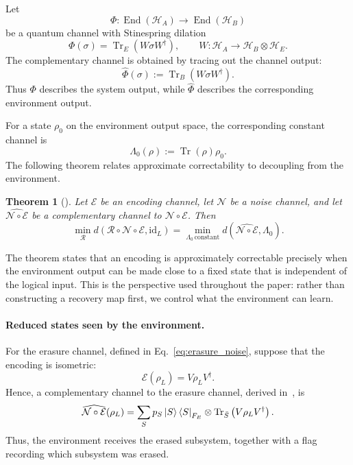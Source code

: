\documentclass[10pt,twocolumn,superscriptaddress,aps,amsmath,amssymb,citeautoscript,floatfix,prx,longbibliography]{revtex4-2}
\newtheorem{theorem}{Theorem}
\theoremstyle{plain}
\theoremstyle{plain}
\theoremstyle{plain}
\theoremstyle{plain}
\theoremstyle{plain}
\theoremstyle{plain}
\begin{document}
Let
$$
\Phi:\operatorname{End}(\mathcal H_A)\to\operatorname{End}(\mathcal H_B)
$$
be a quantum channel with Stinespring dilation
$$
\Phi(\sigma)
=
\operatorname{Tr}_E(W\sigma W^\dagger),
\qquad
W:\mathcal H_A\to\mathcal H_B\otimes\mathcal H_E .
$$
The complementary channel is obtained by tracing out the channel output:
$$
\widehat\Phi(\sigma)
:=
\operatorname{Tr}_B(W\sigma W^\dagger).
$$
Thus $\Phi$ describes the system output, while $\widehat\Phi$ describes the corresponding environment output.

For a state $\rho_0$ on the environment output space, the corresponding constant channel is
\begin{equation}\label{eq:constant_channel_def}
\Lambda_0(\rho)
:=
\operatorname{Tr}(\rho)\rho_0 .
\end{equation}
The following theorem relates approximate correctability to decoupling from the environment.

\begin{theorem}[\citet{Beny2010}]\label{thm:beny}
Let $\mathcal E$ be an encoding channel, let $\mathcal N$ be a noise channel, and let $\widehat{\mathcal N\circ\mathcal E}$ be a complementary channel to $\mathcal N\circ\mathcal E$. Then
\begin{equation}\label{eq:beny}
    \min_{\mathcal R}
    d\left(
        \mathcal R\circ\mathcal N\circ\mathcal E,
        \mathrm{id}_L
    \right)
    =
    \min_{\Lambda_0\,\mathrm{constant}}
    d\left(
        \widehat{\mathcal N\circ\mathcal E},
        \Lambda_0
    \right).
\end{equation}
\end{theorem}

The theorem states that an encoding is approximately correctable precisely when the environment output can be made close to a fixed state that is independent of the logical input. This is the perspective used throughout the paper: rather than constructing a recovery map first, we control what the environment can learn.

\paragraph{Reduced states seen by the environment.}

For the erasure channel, defined in Eq.~\eqref{eq:erasure_noise}, suppose that the encoding is isometric:
\begin{equation}\label{eq:enc_isom}
\mathcal E(\rho_L)
=
V\rho_LV^\dagger .
\end{equation}
Hence, a complementary channel to the erasure channel, derived in~\cite{Faist2020}, is
\begin{equation}\label{eq:dual_to_erasure}
\widehat{\mathcal N\circ\mathcal E}(\rho_L)
=
\sum_S
p_S
\ket S\bra S_{F_E}
\otimes
\operatorname{Tr}_{\bar S}
\left(
V\rho_LV^\dagger
\right).
\end{equation}
Thus, the environment receives the erased subsystem, together with a flag recording which subsystem was erased.
\end{document}
